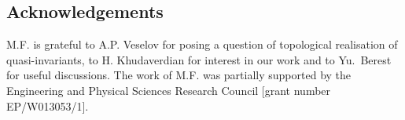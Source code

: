 \documentclass[11pt]{amsart}
\theoremstyle{definition}
\theoremstyle{remark}
\numberwithin{equation}{section}
\begin{document}
\subsection*{Acknowledgements} M.F. is grateful to A.P. Veselov for posing a question of topological realisation of quasi-invariants, to  H. Khudaverdian for interest in our work and to Yu.~Berest for useful discussions. 
The work of M.F. was partially supported by the Engineering and Physical Sciences Research Council [grant number  EP/W013053/1]. 






{}

\end{document}
